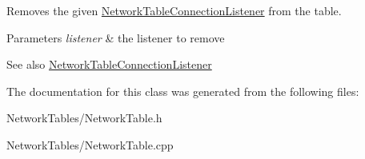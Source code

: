 \label{classNetworkTable_ac8a8666f2eef96064bb2c4a77d667f98}
Removes the given \hyperlink{classNetworkTableConnectionListener}{NetworkTableConnectionListener} from the table. 
\begin{DoxyParams}{Parameters}
{\em listener} & the listener to remove \\
\hline
\end{DoxyParams}
\begin{DoxySeeAlso}{See also}
\hyperlink{classNetworkTableConnectionListener}{NetworkTableConnectionListener} 
\end{DoxySeeAlso}


The documentation for this class was generated from the following files:\begin{DoxyCompactItemize}
\item 
NetworkTables/NetworkTable.h\item 
NetworkTables/NetworkTable.cpp\end{DoxyCompactItemize}
